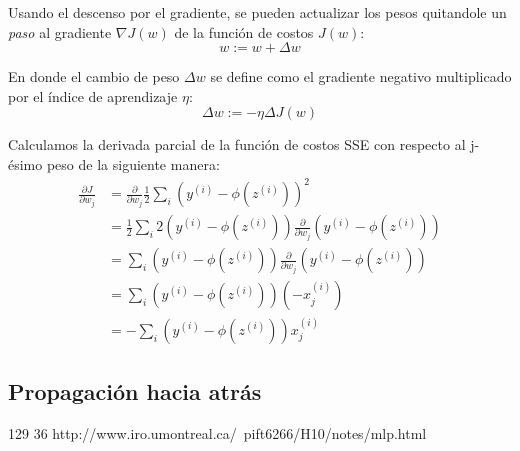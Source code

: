 Usando el descenso por el gradiente, se pueden actualizar los pesos quitandole un \textit{paso}
al gradiente $\nabla J(w)$ de la función de costos $J(w)$:
\begin{equation}
  w := w + \Delta w
\end{equation}

En donde el cambio de peso $\Delta w$ se define como el gradiente negativo multiplicado
por el índice de aprendizaje $\eta$:
\begin{equation}
  \Delta w := -\eta \Delta J(w)
\end{equation}

Calculamos la derivada parcial de la función de costos SSE con respecto al
j-ésimo peso de la siguiente manera:
\begin{equation*}
\begin{split}
  \frac{\partial J}{\partial w_j} &= \frac{\partial}{\partial w_j}\frac{1}{2}\sum_i (y^{(i)} - \phi(z^{(i)}))^2 \\
  &= \frac{1}{2}\sum_i 2(y^{(i)} - \phi(z^{(i)}))\frac{\partial}{\partial w_j}(y^{(i)} - \phi(z^{(i)}))\\
  &= \sum_i (y^{(i)} - \phi(z^{(i)}))\frac{\partial}{\partial w_j}(y^{(i)} - \phi (z^{(i)}))\\
  &= \sum_i(y^{(i)} - \phi(z^{(i)}))(-x_j^{(i)})\\
  &= -\sum_i(y^{(i)} - \phi(z^{(i)}))x_j^{(i)}
\end{split}
\end{equation*}

\subsection{Propagación hacia atrás}
\cite{haykin} 129
\cite{memes} 36
http://www.iro.umontreal.ca/~pift6266/H10/notes/mlp.html
